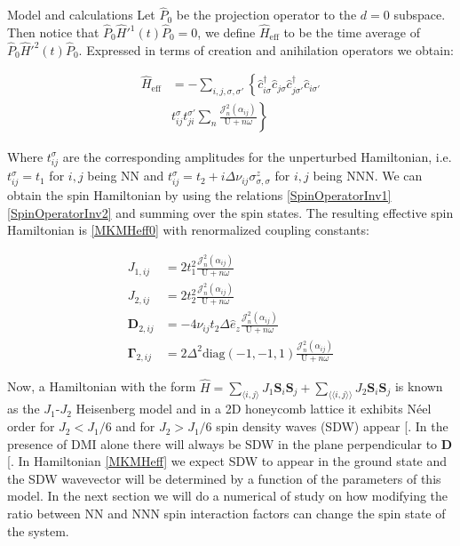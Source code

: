 \documentclass[aps,prl,twocolumn,amsmath,amssymb,superscriptaddress,nobibnotes]{revtex4}%
\renewcommand{\cite}[1]{{[}\onlinecite{#1}{]}}
\newcommand{\n}{\nonumber}
\newcommand{\bs}{\boldsymbol}
\begin{document}
\begin{section}{Model and calculations}
Let $\hat{P}_0$ be the projection operator to the $d=0$ subspace. Then notice that $\hat{P}_0\hat{H}'^{1}(t)\hat{P}_0 = 0$, we define $\hat{H}_{\text{eff}}$ to be the time average of $\hat{P}_0\hat{H}'^{2}(t)\hat{P}_0$. Expressed in terms of creation and anihilation operators we obtain:

\begin{align}
\hat{H}_{\text{eff}} &= - \sum_{i,j, \sigma, \sigma'} \left\{ \hat{c}_{i \sigma}^\dagger \hat{c}_{j \sigma} \hat{c}_{j \sigma'}^\dagger \hat{c}_{i \sigma'} \right. \n \\
&t_{ij}^{\sigma} t_{ji}^{\sigma'} \sum_{n} \frac{\mathcal{J}_{n}^2(\alpha_{ij})}{\text{U}+n\omega} \left. \right\} \label{GeneralHeff}
\end{align}

Where $t_{ij}^{\sigma}$ are the corresponding amplitudes for the unperturbed Hamiltonian, i.e. $t_{ij}^{\sigma} = t_1$ for $i,j$ being NN and $t_{ij}^{\sigma} = t_2 + i\Delta\nu_{ij}\sigma^z_{\sigma, \sigma}$ for $i,j$ being NNN. We can obtain the spin Hamiltonian by using the relations \ref{SpinOperatorInv1} \ref{SpinOperatorInv2} and summing over the spin states. The resulting effective spin Hamiltonian is \ref{MKMHeff0} with renormalized coupling constants:

\begin{align*}
J_{1,ij} &= 2t_1^2\frac{\mathcal{J}_{n}^2(\alpha_{ij})}{\text{U}+n\omega} \\
J_{2,ij} &= 2t_2^2\frac{\mathcal{J}_{n}^2(\alpha_{ij})}{\text{U}+n\omega} \\
\bs{D}_{2,ij} &= - 4\nu_{ij} t_2 \Delta \hat{e}_z \frac{\mathcal{J}_{n}^2(\alpha_{ij})}{\text{U}+n\omega} \\
\bs{\Gamma}_{2,ij} &= 2\Delta^2 \text{diag}(-1,-1,1) \frac{\mathcal{J}_{n}^2(\alpha_{ij})}{\text{U}+n\omega}
\end{align*}

Now, a Hamiltonian with the form $\hat{H} = \sum_{\langle i,j \rangle} J_1 \bs{S}_i\bs{S}_j + \sum_{\langle \langle i,j \rangle \rangle} J_2\bs{S}_i\bs{S}_j$ is known as the $J_1$-$J_2$ Heisenberg model and in a 2D honeycomb lattice it exhibits N\'eel order for $J_2 < J_1 / 6$ and for $J_2 > J_1 / 6$ spin density waves (SDW) appear \cite{Mulder2010}. In the presence of DMI alone there will always be SDW in the plane perpendicular to $\bs{D}$ \cite{Uchida2006}. In Hamiltonian \ref{MKMHeff} we expect SDW to appear in the ground state and the SDW wavevector will be determined by a function of the parameters of this model. In the next section we will do a numerical of study on how modifying the ratio between NN and NNN spin interaction factors can change the spin state of the system.


\end{section}
\end{document}
